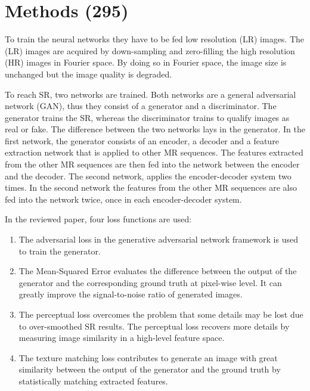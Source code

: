 \documentclass[conference]{IEEEtran}
\begin{document}
\section{Methods (295)}
To train the neural networks they have to be fed low resolution (LR) images. The
(LR) images are acquired by down-sampling and zero-filling the high resolution
(HR) images in Fourier space. By doing so in Fourier space, the image size is
unchanged but the image quality is degraded.

To reach SR, two networks are trained. Both networks are a general adversarial
network (GAN), thus they consist of a generator and a discriminator. The
generator trains the SR, whereas the discriminator trains to qualify images as
real or fake. The difference between the two networks lays in the generator. In
the first network, the generator consists of an encoder, a decoder and a feature
extraction network that is applied to other MR sequences. The features extracted
from the other MR sequences are then fed into the network between the encoder
and the decoder. The second network, applies the encoder-decoder system two
times. In the second network the features from the other MR sequences are also
fed into the network twice, once in each encoder-decoder system.

In the reviewed paper, four loss functions are used:
\begin{enumerate}
    \item The adversarial loss in the generative adversarial network framework is
    used to train the generator.
    \item The Mean-Squared Error evaluates the difference between the output of the
    generator and the corresponding ground truth at pixel-wise level. It can
    greatly improve the signal-to-noise ratio of generated images.
    \item The perceptual loss overcomes the problem that some details may be lost
    due to over-smoothed SR results. The perceptual loss recovers more details
    by measuring image similarity in a high-level feature space.
    \item The texture matching loss contributes to generate an image with great
    similarity between the output of the generator and the ground truth by
    statistically matching extracted features.
\end{enumerate}
\end{document}

